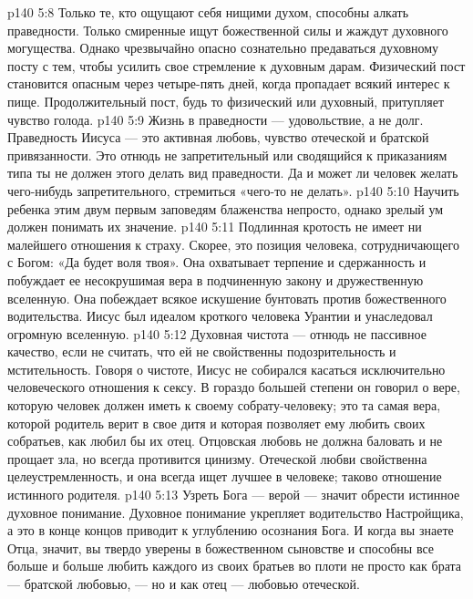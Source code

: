 \vs p140 5:8 \pc {}\bibnobreakspace {} Только те, кто ощущают себя нищими духом, способны алкать праведности. Только смиренные ищут божественной силы и жаждут духовного могущества. Однако чрезвычайно опасно сознательно предаваться духовному посту с тем, чтобы усилить свое стремление к духовным дарам. Физический пост становится опасным через четыре\hyp{}пять дней, когда пропадает всякий интерес к пище. Продолжительный пост, будь то физический или духовный, притупляет чувство голода.
\vs p140 5:9 Жизнь в праведности --- удовольствие, а не долг. Праведность Иисуса --- это активная любовь, чувство отеческой и братской привязанности. Это отнюдь не запретительный или сводящийся к приказаниям типа ты не должен этого делать вид праведности. Да и может ли человек желать чего\hyp{}нибудь запретительного, стремиться «чего\hyp{}то не делать».
\vs p140 5:10 \pc Научить ребенка этим двум первым заповедям блаженства непросто, однако зрелый ум должен понимать их значение.
\vs p140 5:11 \pc {}\bibnobreakspace {} Подлинная кротость не имеет ни малейшего отношения к страху. Скорее, это позиция человека, сотрудничающего с Богом: «Да будет воля твоя». Она охватывает терпение и сдержанность и побуждает ее несокрушимая вера в подчиненную закону и дружественную вселенную. Она побеждает всякое искушение бунтовать против божественного водительства. Иисус был идеалом кроткого человека Урантии и унаследовал огромную вселенную.
\vs p140 5:12 \pc {}\bibnobreakspace {} Духовная чистота --- отнюдь не пассивное качество, если не считать, что ей не свойственны подозрительность и мстительность. Говоря о чистоте, Иисус не собирался касаться исключительно человеческого отношения к сексу. В гораздо большей степени он говорил о вере, которую человек должен иметь к своему собрату\hyp{}человеку; это та самая вера, которой родитель верит в свое дитя и которая позволяет ему любить своих собратьев, как любил бы их отец. Отцовская любовь не должна баловать и не прощает зла, но всегда противится цинизму. Отеческой любви свойственна целеустремленность, и она всегда ищет лучшее в человеке; таково отношение истинного родителя.
\vs p140 5:13 Узреть Бога --- верой --- значит обрести истинное духовное понимание. Духовное понимание укрепляет водительство Настройщика, а это в конце концов приводит к углублению осознания Бога. И когда вы знаете Отца, значит, вы твердо уверены в божественном сыновстве и способны все больше и больше любить каждого из своих братьев во плоти не просто как брата --- братской любовью, --- но и как отец --- любовью отеческой.
